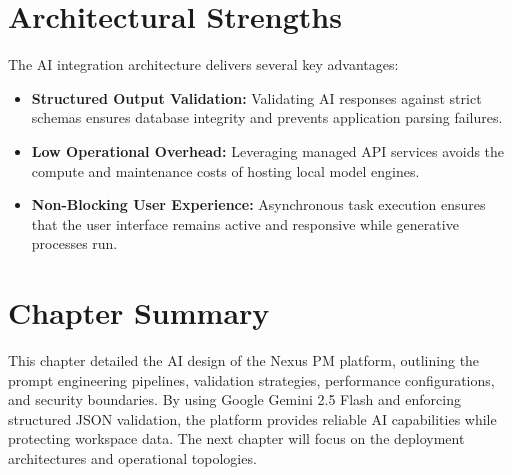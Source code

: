\section{Architectural Strengths}
The AI integration architecture delivers several key advantages:
\begin{itemize}
    \item \textbf{Structured Output Validation:} Validating AI responses against strict schemas ensures database integrity and prevents application parsing failures.
    \item \textbf{Low Operational Overhead:} Leveraging managed API services avoids the compute and maintenance costs of hosting local model engines.
    \item \textbf{Non-Blocking User Experience:} Asynchronous task execution ensures that the user interface remains active and responsive while generative processes run.
\end{itemize}

\section{Chapter Summary}
This chapter detailed the AI design of the Nexus PM platform, outlining the prompt engineering pipelines, validation strategies, performance configurations, and security boundaries. By using Google Gemini 2.5 Flash and enforcing structured JSON validation, the platform provides reliable AI capabilities while protecting workspace data. The next chapter will focus on the deployment architectures and operational topologies.
